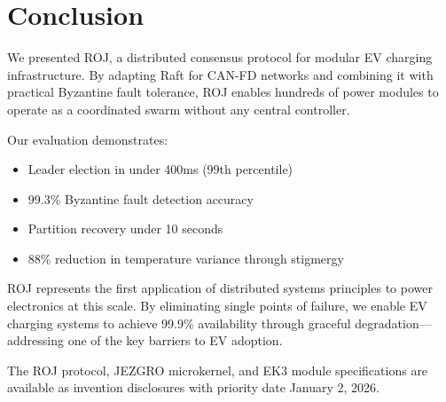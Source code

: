 \documentclass[conference,10pt]{IEEEtran}
\begin{document}
\section{Conclusion}
\label{sec:conclusion}

We presented ROJ, a distributed consensus protocol for modular EV charging infrastructure. By adapting Raft for CAN-FD networks and combining it with practical Byzantine fault tolerance, ROJ enables hundreds of power modules to operate as a coordinated swarm without any central controller.

Our evaluation demonstrates:
\begin{itemize}
    \item Leader election in under 400ms (99th percentile)
    \item 99.3\% Byzantine fault detection accuracy
    \item Partition recovery under 10 seconds
    \item 88\% reduction in temperature variance through stigmergy
\end{itemize}

ROJ represents the first application of distributed systems principles to power electronics at this scale. By eliminating single points of failure, we enable EV charging systems to achieve 99.9\% availability through graceful degradation---addressing one of the key barriers to EV adoption.

The ROJ protocol, JEZGRO microkernel, and EK3 module specifications are available as invention disclosures with priority date January 2, 2026.

\end{document}
